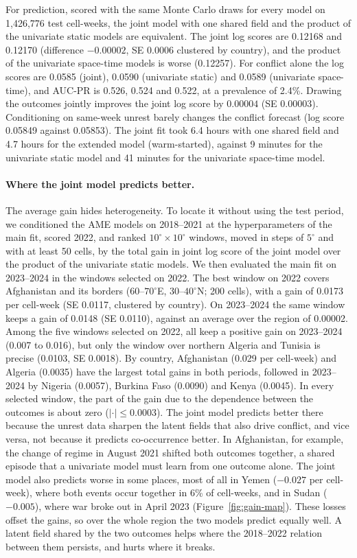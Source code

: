 For prediction, scored with the same Monte Carlo draws for every model on 1{,}426{,}776
test cell-weeks, the joint model with one shared field and the product of the
univariate static models are equivalent. The joint log scores are 0.12168 and 0.12170
(difference $-0.00002$, SE $0.0006$ clustered by country), and the product of the
univariate space-time models is worse (0.12257). For conflict alone the log scores
are 0.0585 (joint), 0.0590 (univariate static) and 0.0589 (univariate space-time), and
AUC-PR is 0.526, 0.524 and 0.522, at a prevalence of 2.4\%. Drawing the outcomes
jointly improves the joint log score by $0.00004$ (SE $0.00003$). Conditioning on
same-week unrest barely changes the conflict forecast (log score 0.05849 against
0.05853). The joint fit took 6.4 hours with one shared field and 4.7 hours for the
extended model (warm-started), against 9 minutes for the univariate static model and 41 minutes for the univariate
space-time model.

\paragraph{Where the joint model predicts better.} The average gain hides
heterogeneity. To locate it without using the test period, we conditioned the AME
models on 2018--2021 at the hyperparameters of the main fit, scored 2022, and ranked
$10^\circ \times 10^\circ$ windows, moved in steps of $5^\circ$ and with at least 50
cells, by the total gain in joint log score of the joint model over the product of the
univariate static models. We then evaluated the main fit on 2023--2024 in the windows
selected on 2022. The best window on 2022 covers Afghanistan and its borders
($60$--$70^\circ$E, $30$--$40^\circ$N; 200 cells), with a gain of 0.0173 per
cell-week (SE 0.0117, clustered by country). On 2023--2024 the same window keeps a
gain of 0.0148 (SE 0.0110), against an average over the region of 0.00002. Among
the five windows selected on 2022, all keep a positive gain on 2023--2024 (0.007 to
0.016), but only the window over northern Algeria and Tunisia is precise (0.0103, SE
0.0018). By country, Afghanistan (0.029 per cell-week) and Algeria (0.0035) have the
largest total gains in both periods, followed in 2023--2024 by Nigeria (0.0057),
Burkina Faso (0.0090) and Kenya (0.0045). In every selected window, the part of the
gain due to the dependence between the outcomes is about zero ($|{\cdot}| \le 0.0003$).
The joint model predicts better there because the unrest data sharpen the latent
fields that also drive conflict, and vice versa, not because it predicts co-occurrence
better. In Afghanistan, for example, the change of regime in August 2021
shifted both outcomes together, a shared episode that a univariate model must learn from one
outcome alone. The joint
model also predicts worse in some places, most of all in Yemen ($-0.027$ per
cell-week), where both events occur together in 6\% of cell-weeks, and in Sudan
($-0.005$), where war broke out in April 2023 (Figure~\ref{fig:gain-map}). These
losses offset the gains, so over the whole region the two models predict equally well.
A latent field shared by the two outcomes helps where the 2018--2022 relation between
them persists, and hurts where it breaks.

